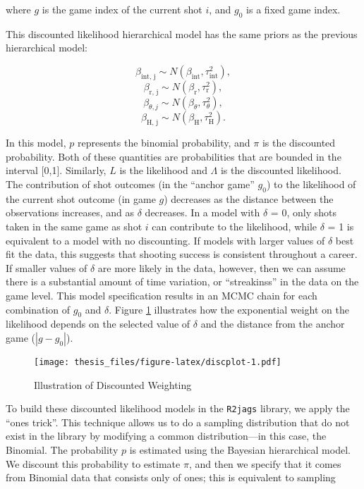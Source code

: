 \documentclass[12pt,twoside]{dukestatscithesis}
\theoremstyle{definition}
\theoremstyle{definition}
\theoremstyle{definition}
\theoremstyle{remark}
\begin{document}
where \({g}\) is the game index of the current shot \(\textit{i}\), and
\(g_0\) is a fixed game index.

This discounted likelihood hierarchical model has the same priors as the
previous hierarchical model:

\[
\beta_{\text{int, j}} \sim N(\beta_{\text{int}}, \tau^2_{\text{int}}),
\] \[
\beta_{\text{r, j}} \sim N(\beta_{\text{r}}, \tau^2_{\text{r}}),
\] \[
\beta_{\theta, j} \sim N(\beta_{\theta}, \tau^2_{\theta}),
\] \[
\beta_{\text{H, j}} \sim N(\beta_{\text{H}}, \tau^2_{\text{H}}).
\]

In this model, \(p\) represents the binomial probability, and \(\pi\) is
the discounted probability. Both of these quantities are probabilities
that are bounded in the interval {[}0,1{]}. Similarly, \(L\) is the
likelihood and \(\Lambda\) is the discounted likelihood. The
contribution of shot outcomes (in the ``anchor game'' \(g_0\)) to the
likelihood of the current shot outcome (in game \(g\)) decreases as the
distance between the observations increases, and as \(\delta\)
decreases. In a model with \(\delta\) = 0, only shots taken in the same
game as shot \(i\) can contribute to the likelihood, while \(\delta\) =
1 is equivalent to a model with no discounting. If models with larger
values of \(\delta\) best fit the data, this suggests that shooting
success is consistent throughout a career. If smaller values of
\(\delta\) are more likely in the data, however, then we can assume
there is a substantial amount of time variation, or ``streakinss'' in
the data on the game level. This model specification results in an MCMC
chain for each combination of \(g_0\) and \(\delta\). Figure
\ref{fig:discplot} illustrates how the exponential weight on the
likelihood depends on the selected value of \(\delta\) and the distance
from the anchor game (\(|g - g_0|\)).
\begin{figure}[htbp]
\centering
\texttt{[image: thesis\_files/figure-latex/discplot-1.pdf]}
\caption{\label{fig:discplot}Illustration of Discounted Weighting}
\end{figure}
To build these discounted likelihood models in the \texttt{R2jags}
library, we apply the ``ones trick''. This technique allows us to do a
sampling distribution that do not exist in the library by modifying a
common distribution---in this case, the Binomial. The probability \(p\)
is estimated using the Bayesian hierarchical model. We discount this
probability to estimate \(\pi\), and then we specify that it comes from
Binomial data that consists only of ones; this is equivalent to sampling
\end{document}
